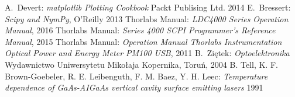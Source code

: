 \begin{thebibliography}{99}
  A.~Devert:
\emph{matplotlib Plotting Cookbook}
Packt Publising Ltd. 2014
 E.~Bressert:
\emph{Scipy and NymPy},
O'Reilly 2013
 Thorlabs Manual:
\emph{LDC4000 Series Operation Manual},
2016
 Thorlabs Manual:
\emph{Series 4000 SCPI Programmer's Reference Manual},
2015
 Thorlabs Manual:
\emph{Operation Manual
Thorlabs Instrumentation Optical Power and Energy Meter PM100 USB},
2011
  B.~Ziętek:
\emph{Optoelektronika}
Wydawnictwo Uniwersytetu Mikołaja Kopernika, Toruń, 2004
 B. Tell, K. F. Brown-Goebeler, R. E. Leibenguth, F. M.  Baez, Y. H. Leec:
\emph{Temperature dependence of GaAs-AIGaAs vertical cavity surface emitting lasers }
1991
\end{thebibliography}
